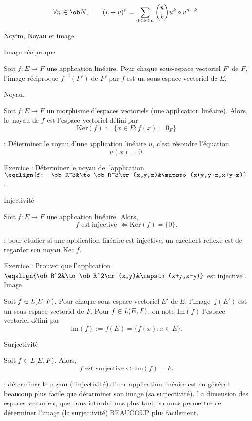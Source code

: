 \Theoreme [Title=binôme de Newton;$u$ et $v$ endomorphismes vérifiant {$u\circ v=v\circ u$}] 
$$
\forall n\in\ob N, \qquad {(u+v)^n=\sum_{0\le k\le n}{n\choose k}u^k\circ v^{n-k}}.
$$

\Subsection Noyim, Noyau et image.

\Concept [] Image réciproque

Soit $f:E\to F$ une application linéaire. Pour chaque sous-espace vectoriel $F'$ de $F$, 
l'image réciproque $f^{-1}(F')$ de $F'$ par $f$ est un sous-espace vectoriel de $E$. 
\bigskip

\Concept [] Noyau.

\noindent
Soit $f:E\to F$ un morphisme d'espaces vectoriels (une application linéaire). Alors, le~noyau de $f$ 
est l'espace vectoriel défini par 
$${
\mbox{Ker}(f):=\{x\in E:f(x)=0_F\}}
$$ 

\Remarque : Déterminer le noyau d'une application linéaire $u$, c'est résoudre l'équation 
$$
u(x)=0.
$$ 
\bigskip


 Exercice :  Déterminer le noyau de l'application $\eqalign{f: \ob R^3&\to\ob R^3\cr(x,y,z)&\mapsto  (x+y,y+z,x+y+z)}$. 
\bigskip

\Concept [] Injectivité

\noindent
Soit $f:E\to F$ une application linéaire. Alors, 
$${
f\mbox{ est injective }\Longleftrightarrow \mbox{Ker}(f)=\{0\}}.
$$ 


\Remarque : pour étudier si une application linéaire est injective, un excellent reflexe est de regarder son noyau $\mbox{Ker }f$. 
\bigskip

 Exercice :  Prouver que l'application $\eqalign{\ob R^2&\to\ob R^2\cr(x,y)&\mapsto  (x+y,x-y)}$ est injective .
\bigskip
\Concept [] Image 

\Propriete []  Soit $f\in\sc L(E,F)$. Pour chaque sous-espace vectoriel $E'$ de $E$, l'image~$f(E')$ est un sous-espace vectoriel de $F$. 
\bigskip
\noindent
Pour $f\in\sc L(E,F)$, on note $\mbox{Im}(f)$ l'espace vectoriel défini par 
$$
{\mbox{Im}(f):=f(E)=\{f(x):x\in E\}}.
$$

\Concept [] Surjectivité

\Propriete []  Soit $f\in\sc L(E,F)$. Alors, 
$$
f\mbox{ est surjective}\Longleftrightarrow \mbox{Im}(f)=F. 
$$

\Remarque : déterminer le noyau (l'injectivité) d'une application linéaire est en général beaucoup plus facile que détarminer son image (sa surjectivité). La dimension des espaces vectoriels, que nous introduirons plus tard, va nous permettre de déterminer l'image (la surjectivité) BEAUCOUP plus facilement. 
\bigskip

